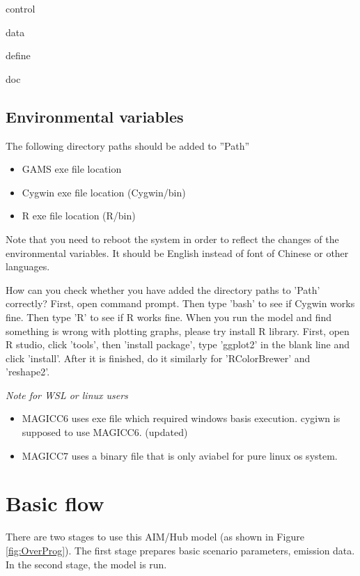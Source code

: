 \documentclass[10pt,a4paper,titlepage,dvipdfmx]{book}
\begin{document}
   {\textbar}control

   {\textbar}data

   {\textbar}define

   {\textbar}doc

   {\textbar}

\subsection{\label{sub:EnvVar}Environmental variables}

The following directory paths should be added to ''Path''
\begin{itemize}
\item GAMS exe file location
\item Cygwin exe file location (Cygwin/bin)
\item R exe file location (R/bin)
\end{itemize}
Note that you need to reboot the system in order to reflect the changes of the environmental variables. It should be English instead of font of Chinese or other languages.

How can you check whether you have added the directory paths to 'Path' correctly? First, open command prompt. Then type 'bash' to see if Cygwin works fine. Then type 'R' to see if R works fine.
When you run the model and find something is wrong with plotting graphs, please try install R library. First, open R studio, click 'tools', then 'install package', type 'ggplot2' in the blank line and click 'install'. After it is finished, do it similarly for 'RColorBrewer' and 'reshape2'.

\emph{Note for WSL or linux users}
\begin{itemize}
\item MAGICC6 uses exe file which required windows basis execution. cygiwn is supposed to use MAGICC6.  
(updated)
\item MAGICC7 uses a binary file that is only aviabel for pure linux os system.
\end{itemize}



\section{ \label{ref-0065}Basic flow\label{mark-6.2.}}

There are two stages to use this AIM/Hub model (as shown in Figure \ref{fig:OverProg}). The first stage prepares basic scenario parameters, emission data. In the second stage, the model is run. 
\end{document}
